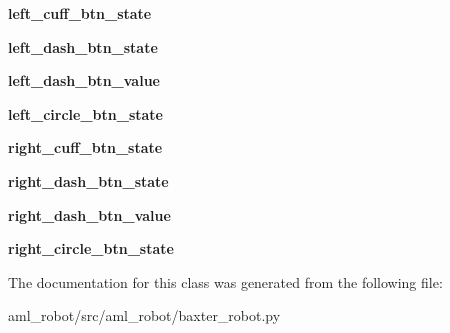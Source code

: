 \begin{DoxyCompactItemize}
\hypertarget{classaml__robot_1_1baxter__robot_1_1_baxter_button_status_a3d147c0e2ab38474d2cb2d2cb358e9c6}{}\label{classaml__robot_1_1baxter__robot_1_1_baxter_button_status_a3d147c0e2ab38474d2cb2d2cb358e9c6} 
{\bfseries left\+\_\+cuff\+\_\+btn\+\_\+state}
\item 
\hypertarget{classaml__robot_1_1baxter__robot_1_1_baxter_button_status_a9858defbdfd1953111bc032a679dfbf6}{}\label{classaml__robot_1_1baxter__robot_1_1_baxter_button_status_a9858defbdfd1953111bc032a679dfbf6} 
{\bfseries left\+\_\+dash\+\_\+btn\+\_\+state}
\item 
\hypertarget{classaml__robot_1_1baxter__robot_1_1_baxter_button_status_ac4505635cb0c3096d50145a00aa996e1}{}\label{classaml__robot_1_1baxter__robot_1_1_baxter_button_status_ac4505635cb0c3096d50145a00aa996e1} 
{\bfseries left\+\_\+dash\+\_\+btn\+\_\+value}
\item 
\hypertarget{classaml__robot_1_1baxter__robot_1_1_baxter_button_status_a2cf8425649007e50335a7eab640138bd}{}\label{classaml__robot_1_1baxter__robot_1_1_baxter_button_status_a2cf8425649007e50335a7eab640138bd} 
{\bfseries left\+\_\+circle\+\_\+btn\+\_\+state}
\item 
\hypertarget{classaml__robot_1_1baxter__robot_1_1_baxter_button_status_a0b2de8e8474d9e9217024692b425a0b4}{}\label{classaml__robot_1_1baxter__robot_1_1_baxter_button_status_a0b2de8e8474d9e9217024692b425a0b4} 
{\bfseries right\+\_\+cuff\+\_\+btn\+\_\+state}
\item 
\hypertarget{classaml__robot_1_1baxter__robot_1_1_baxter_button_status_a99abdcffd19c44a10cb1f4a875adbb2d}{}\label{classaml__robot_1_1baxter__robot_1_1_baxter_button_status_a99abdcffd19c44a10cb1f4a875adbb2d} 
{\bfseries right\+\_\+dash\+\_\+btn\+\_\+state}
\item 
\hypertarget{classaml__robot_1_1baxter__robot_1_1_baxter_button_status_a990924b4c4d0b7f05b7fc909b3b7cc2f}{}\label{classaml__robot_1_1baxter__robot_1_1_baxter_button_status_a990924b4c4d0b7f05b7fc909b3b7cc2f} 
{\bfseries right\+\_\+dash\+\_\+btn\+\_\+value}
\item 
\hypertarget{classaml__robot_1_1baxter__robot_1_1_baxter_button_status_a6b266aa0af869f160bd2654e6fde6756}{}\label{classaml__robot_1_1baxter__robot_1_1_baxter_button_status_a6b266aa0af869f160bd2654e6fde6756} 
{\bfseries right\+\_\+circle\+\_\+btn\+\_\+state}
\end{DoxyCompactItemize}


The documentation for this class was generated from the following file\+:\begin{DoxyCompactItemize}
\item 
aml\+\_\+robot/src/aml\+\_\+robot/baxter\+\_\+robot.\+py\end{DoxyCompactItemize}
